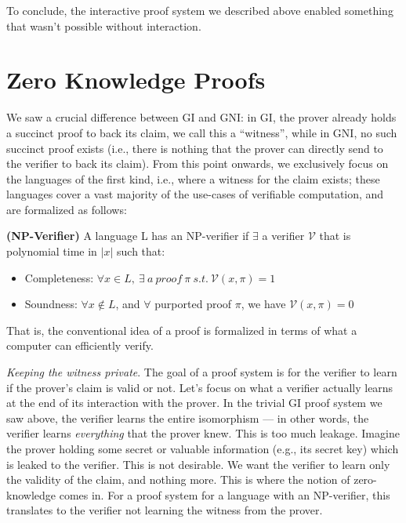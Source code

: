 \documentclass[12pt]{tufte-book}
\begin{document}
To conclude, the interactive proof system we described above enabled something that wasn't possible without interaction. 

\section{Zero Knowledge Proofs}
We saw a crucial difference between GI and GNI: in GI, the prover already holds a succinct proof to back its claim, we call this a ``witness'', while in GNI, no such succinct proof exists (i.e., there is nothing that the prover can directly send to the verifier to back its claim). From this point onwards, we exclusively focus on the languages of the first kind, i.e., where a witness for the claim exists; these languages cover a vast majority of the use-cases of verifiable computation, and are formalized as follows:

\begin{definition} {\normalfont\textbf{(NP-Verifier)}} A language L has an NP-verifier if $\exists$ a verifier $\mathcal{V}$ that is polynomial time in $|x|$ such that:
		\begin{itemize}
			\item Completeness: $\forall x\in L,\ \exists\ a\ proof\ \pi\ s.t.\ \mathcal{V}(x,\pi)=1$
			\item Soundness: $\forall x \notin L$, and $\forall$ purported proof $\pi$, we have $\mathcal{V}(x,\pi)=0$
		\end{itemize}
  \end{definition}

		That is, the conventional idea of a proof is formalized in terms of what a computer can efficiently verify.\smallskip 

	\noindent \textit{Keeping the witness private}. The goal of a proof system is for the verifier to learn if the prover's claim is valid or not. Let's focus on what a verifier actually learns at the end of its interaction with the prover. In the trivial GI proof system we saw above, the verifier learns the entire isomorphism --- in other words, the verifier learns {\em everything} that the prover knew. 
	This is too much leakage. Imagine the prover holding some secret or valuable information (e.g., its secret key) which is leaked to the verifier. This is not desirable. We want the verifier to learn only the validity of the claim, and nothing more. This is where the notion of zero-knowledge comes in.
	For a proof system for a language with an NP-verifier, this translates to the verifier not learning the witness from the prover.
\end{document}

